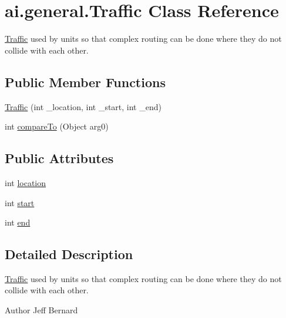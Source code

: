 \hypertarget{classai_1_1general_1_1_traffic}{
\section{ai.general.Traffic Class Reference}
\label{classai_1_1general_1_1_traffic}
}


\hyperlink{classai_1_1general_1_1_traffic}{Traffic} used by units so that complex routing can be done where they do not collide with each other.  


\subsection*{Public Member Functions}
\begin{DoxyCompactItemize}
\item 
\hyperlink{classai_1_1general_1_1_traffic_a5b9e392d67f70b50c7aff042edc9e83e}{Traffic} (int \_\-location, int \_\-start, int \_\-end)
\item 
int \hyperlink{classai_1_1general_1_1_traffic_ace78dd72f20929d961603f2e690a766e}{compareTo} (Object arg0)
\end{DoxyCompactItemize}
\subsection*{Public Attributes}
\begin{DoxyCompactItemize}
\item 
int \hyperlink{classai_1_1general_1_1_traffic_a158af021968f53b9e7ddc9fa53c79a06}{location}
\item 
int \hyperlink{classai_1_1general_1_1_traffic_a0446adee9e4afb8cfe6118ad30a45732}{start}
\item 
int \hyperlink{classai_1_1general_1_1_traffic_ad70ae05cfd6c796fbc13c9cf9f6ff6a7}{end}
\end{DoxyCompactItemize}


\subsection{Detailed Description}
\hyperlink{classai_1_1general_1_1_traffic}{Traffic} used by units so that complex routing can be done where they do not collide with each other. 

\begin{DoxyAuthor}{Author}
Jeff Bernard 
\end{DoxyAuthor}


